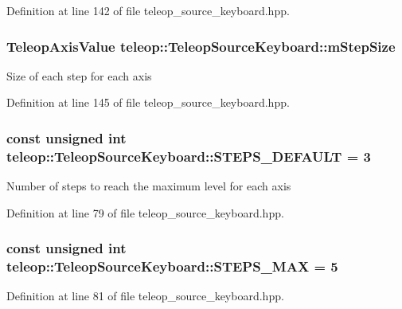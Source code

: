 Definition at line 142 of file teleop\_\-source\_\-keyboard.hpp.

\subsubsection[{mStepSize}]{\setlength{\rightskip}{0pt plus 5cm}TeleopAxisValue {\bf teleop::TeleopSourceKeyboard::mStepSize}\hspace{0.3cm}{\ttfamily  [private]}}\label{classteleop_1_1TeleopSourceKeyboard_a84793b148b522a324a52d5102f7c1266}
Size of each step for each axis 

Definition at line 145 of file teleop\_\-source\_\-keyboard.hpp.

\subsubsection[{STEPS\_\-DEFAULT}]{\setlength{\rightskip}{0pt plus 5cm}const unsigned int {\bf teleop::TeleopSourceKeyboard::STEPS\_\-DEFAULT} = 3\hspace{0.3cm}{\ttfamily  [static]}}\label{classteleop_1_1TeleopSourceKeyboard_a798dfd6b95ffa7394f4b610e08355fb7}
Number of steps to reach the maximum level for each axis 

Definition at line 79 of file teleop\_\-source\_\-keyboard.hpp.

\subsubsection[{STEPS\_\-MAX}]{\setlength{\rightskip}{0pt plus 5cm}const unsigned int {\bf teleop::TeleopSourceKeyboard::STEPS\_\-MAX} = 5\hspace{0.3cm}{\ttfamily  [static]}}\label{classteleop_1_1TeleopSourceKeyboard_a82e7603533531b605f3e148d1de7366e}


Definition at line 81 of file teleop\_\-source\_\-keyboard.hpp.

